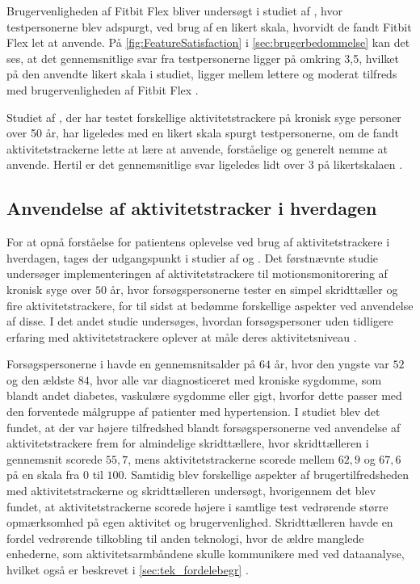 Brugervenligheden af Fitbit Flex bliver undersøgt i studiet af \citeauthor{kaewkannate2016}, hvor testpersonerne blev adspurgt, ved brug af en likert skala, hvorvidt de fandt Fitbit Flex let at anvende. På \autoref{fig:FeatureSatisfaction} i \autoref{sec:brugerbedommelse} kan det ses, at det gennemsnitlige svar fra testpersonerne ligger på omkring 3,5, hvilket på den anvendte likert skala i studiet, ligger mellem lettere og moderat tilfreds med brugervenligheden af Fitbit Flex \citep{kaewkannate2016}.

Studiet af \citeauthor{mercer2016}, der har testet forskellige aktivitetstrackere på kronisk syge personer over 50 år, har ligeledes med en likert skala spurgt testpersonerne, om de fandt aktivitetstrackerne lette at lære at anvende, forståelige og generelt nemme at anvende. Hertil er det gennemsnitlige svar ligeledes lidt over 3 på likertskalaen \citep{mercer2016}.

\subsection{Anvendelse af aktivitetstracker i hverdagen} \label{sec:anvendelse}

For at opnå forståelse for patientens oplevelse ved brug af aktivitetstrackere i hverdagen, tages der udgangspunkt i studier af \citeauthor{mercer2016} og \citeauthor{rapp2016}. Det førstnævnte studie undersøger implementeringen af aktivitetstrackere til motionsmonitorering af kronisk syge over $50$ år, hvor forsøgspersonerne tester en simpel skridttæller og fire aktivitetstrackere, for til sidst at bedømme forskellige aspekter ved anvendelse af disse. I det andet studie undersøges, hvordan forsøgspersoner uden tidligere erfaring med aktivitetstrackere oplever at måle deres aktivitetsniveau \citep{mercer2016, rapp2016}.

Forsøgspersonerne i \citeauthor{mercer2016} havde en gennemsnitsalder på $64$ år, hvor den yngste var $52$ og den ældste $84$, hvor alle var diagnosticeret med kroniske sygdomme, som blandt andet diabetes, vaskulære sygdomme eller gigt, hvorfor dette passer med den forventede målgruppe af patienter med hypertension. I studiet blev det fundet, at der var højere tilfredshed blandt forsøgspersonerne ved anvendelse af aktivitetstrackere frem for almindelige skridttællere, hvor skridttælleren i gennemsnit scorede $55,7$, mens aktivitetstrackerne scorede mellem $62,9$ og $67,6$ på en skala fra $0$ til $100$. Samtidig blev forskellige aspekter af brugertilfredsheden med aktivitetstrackerne og skridttælleren undersøgt, hvorigennem det blev fundet, at aktivitetstrackerne scorede højere i samtlige test vedrørende større opmærksomhed på egen aktivitet og brugervenlighed. Skridttælleren havde en fordel vedrørende tilkobling til anden teknologi, hvor de ældre manglede enhederne, som aktivitetsarmbåndene skulle kommunikere med ved dataanalyse, hvilket også er beskrevet i \autoref{sec:tek_fordelebegr} \citep{mercer2016}.

